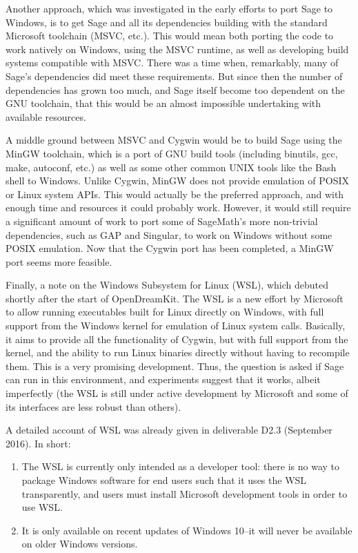 Another approach, which was investigated in the early efforts to port Sage
to Windows, is to get Sage and all its dependencies building with
the standard Microsoft toolchain (MSVC, etc.). This would mean both
porting the code to work natively on Windows, using the MSVC runtime, as
well as developing build systems compatible with MSVC. There was a time
when, remarkably, many of Sage's dependencies did meet these
requirements. But since then the number of dependencies has grown too
much, and Sage itself become too dependent on the GNU toolchain, that
this would be an almost impossible undertaking with available resources.

A middle ground between MSVC and Cygwin would be to build Sage using the
MinGW toolchain, which is a port of GNU build tools (including binutils,
gcc, make, autoconf, etc.) as well as some other common UNIX tools like
the Bash shell to Windows. Unlike Cygwin, MinGW does not provide
emulation of POSIX or Linux system APIs. This would actually be the
preferred approach, and with enough time and resources it could probably
work. However, it would still require a significant amount of work to
port some of SageMath's more non-trivial dependencies, such as GAP and
Singular, to work on Windows without some POSIX emulation. Now that the
Cygwin port has been completed, a MinGW port seems more feasible.

Finally, a note on the Windows Subsystem for Linux (WSL), which debuted shortly
after the start of OpenDreamKit. The WSL is a new effort by Microsoft to allow
running executables built for Linux directly on Windows, with full support from
the Windows kernel for emulation of Linux system calls. Basically, it aims to
provide all the functionality of Cygwin, but with full support from the kernel,
and the ability to run Linux binaries directly without having to recompile
them. This is a very promising development. Thus, the question is asked if Sage
can run in this environment, and experiments suggest that it works, albeit
imperfectly (the WSL is still under active development by Microsoft and some of
its interfaces are less robust than others).

A detailed account of WSL was already given in deliverable D2.3
(September 2016). In short:
\begin{enumerate}
\def\labelenumi{\arabic{enumi})}
\item The WSL is currently only intended as a developer tool: there is no way
    to package Windows software for end users such that it uses the WSL
    transparently, and users must install Microsoft development tools in order
    to use WSL.

\item It is only available on recent updates of Windows 10--it will never be
    available on older Windows versions.
\end{enumerate}


